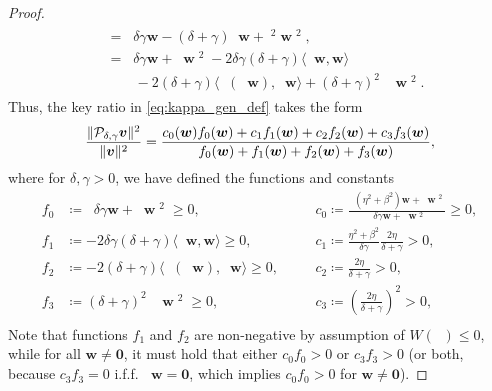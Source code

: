 \documentclass[review]{siamart}
\DeclareMathOperator{\cL}{\widehat{\mathcal{L}}}
\DeclareMathOperator{\cLs}{\widehat{\mathcal{L}}^2}
\DeclareMathOperator{\bVert}{\big\Vert}
\begin{document}
\begin{proof}
\begin{align}
\begin{split}
&= \bVert \delta\gamma \bm{w} -(\delta+\gamma)\cL\bm{w} + \cL^2\bm{w} \bVert^2, \\
&= \bVert \delta \gamma \bm{w} + \cLs \bm{w} \bVert^2  
	- 2 \delta \gamma (\delta + \gamma ) \langle \cL \bm{w}, \bm{w} \rangle
	\\&\quad\quad	
	-2  (\delta + \gamma ) \langle \cL ( \cL \bm{w}), \cL \bm{w} \rangle 
	+  (\delta + \gamma)^2 \bVert \cL \bm{w} \bVert^2.
\end{split}
\end{align}
%
Thus, the key ratio in \eqref{eq:kappa_gen_def} takes the form
\begin{align}
\label{eq:P_gen_frac}
\frac{\Vert {\cal P}_{\delta,\gamma} \bm{v} \Vert^2}{\Vert \bm{v} \Vert^2}
=
\frac{
c_0(\bm{w}) f_0(\bm{w}) + c_1 f_1(\bm{w}) + c_2 f_2(\bm{w}) + c_3 f_3(\bm{w})
}
{
f_0(\bm{w}) + f_1(\bm{w}) + f_2(\bm{w}) + f_3(\bm{w})
},
\end{align}
where for $\delta, \gamma > 0$, we have defined the functions and constants
\begin{equation}
\begin{aligned}
\label{eq:f_c_gen_def}
f_0 &\coloneqq \bVert \delta \gamma \bm{w} + \cLs \bm{w} \bVert^2 \geq 0,
\quad
&&c_0\coloneqq \frac{\bVert (\eta^2 + \beta^2) \bm{w} + \cLs \bm{w} \bVert^2}{\bVert \delta \gamma \bm{w} + \cLs \bm{w} \bVert^2} \geq 0,
\\
f_1 &\coloneqq -2 \delta \gamma (\delta + \gamma)  \langle \cL \bm{w}, \bm{w} \rangle \geq 0,
\quad 
&&c_1\coloneqq \frac{\eta^2 + \beta^2}{\delta \gamma} \frac{2 \eta}{\delta + \gamma} > 0,\\
f_2 &\coloneqq -2( \delta + \gamma) \langle \cL( \cL \bm{w}), \cL \bm{w} \rangle \geq 0, 
\quad
&&c_2\coloneqq \frac{2 \eta}{\delta + \gamma} > 0,\\
f_3 &\coloneqq (\delta+\gamma)^2 \bVert \cL \bm{w} \bVert^2 \geq 0, 
\quad
&&c_3\coloneqq \left(\frac{2 \eta}{\delta + \gamma}\right)^2 > 0, \\
\end{aligned}
\end{equation}
Note that functions $f_1$ and $f_2$ are non-negative by
assumption of $W( \cL ) \leq 0$, while for all $\bm{w}\neq\mathbf{0}$, it must hold that
either $c_0f_0 > 0$ or $c_3f_3 > 0$ (or both, because $c_3f_3 = 0$ i.f.f.
$\cL\mathbf{w} = \mathbf{0}$, which implies $c_0f_0 > 0$ for $\mathbf{w}\neq\mathbf{0}$).


\end{proof}
\end{document}
